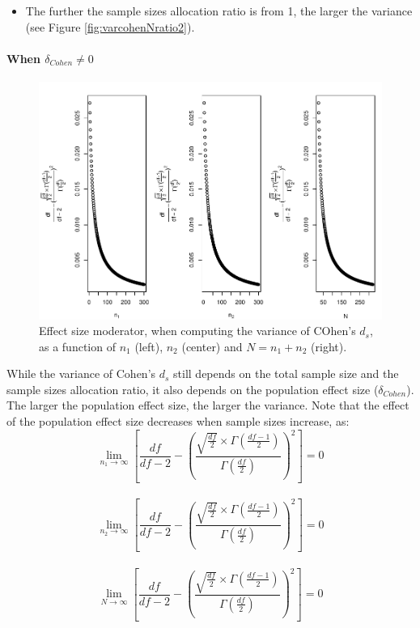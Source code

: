 \documentclass[
  man]{apa6}
\providecommand{\tightlist}{%
  \setlength{\itemsep}{0pt}\setlength{\parskip}{0pt}}
\begin{document}
\begin{itemize}
\tightlist
\item
  The further the sample sizes allocation ratio is from 1, the larger the variance (see Figure \ref{fig:varcohenNratio2}).
\end{itemize}

\hypertarget{when-delta_cohen-neq-0}{%
\paragraph{\texorpdfstring{When \(\delta_{Cohen} \neq 0\)}{When \textbackslash delta\_\{Cohen\} \textbackslash neq 0}}\label{when-delta_cohen-neq-0}}

\begin{figure}
\centering
\includegraphics{Theoretical-Variance-of-all-estimators-as-a-function-of-population-parameters_files/figure-latex/ESmoderatorcohenNsize2-1.pdf}
\caption{\label{fig:ESmoderatorcohenNsize2}Effect size moderator, when computing the variance of COhen's \(d_s\), as a function of \(n_1\) (left), \(n_2\) (center) and \(N=n_1+n_2\) (right).}
\end{figure}

While the variance of Cohen's \(d_s\) still depends on the total sample size and the sample sizes allocation ratio, it also depends on the population effect size (\(\delta_{Cohen}\)). The larger the population effect size, the larger the variance. Note that the effect of the population effect size decreases when sample sizes increase, as:\\
\[\lim_{n_1\rightarrow \infty}\left[\frac{df}{df-2} - \left( \frac{\sqrt{\frac{df}{2}} \times \Gamma \left(\frac{df-1}{2} \right)}{\Gamma \left( \frac{df}{2}\right)}\right)^2 \right]=0\]\\
\[\lim_{n_2\rightarrow \infty}\left[\frac{df}{df-2} - \left( \frac{\sqrt{\frac{df}{2}} \times \Gamma \left(\frac{df-1}{2} \right)}{\Gamma \left( \frac{df}{2}\right)}\right)^2 \right]=0\]\\
\[\lim_{N\rightarrow \infty}\left[\frac{df}{df-2} - \left( \frac{\sqrt{\frac{df}{2}} \times \Gamma \left(\frac{df-1}{2} \right)}{\Gamma \left( \frac{df}{2}\right)}\right)^2 \right]=0\]
\end{document}
